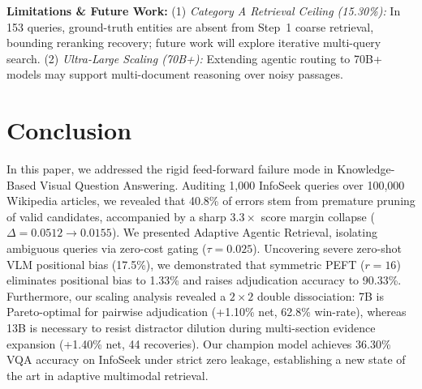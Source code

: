 \documentclass[conference]{IEEEtran}
\begin{document}
\textbf{Limitations \& Future Work:}
(1) \textit{Category A Retrieval Ceiling (15.30\%):} In 153 queries, ground-truth entities are absent from Step~1 coarse retrieval, bounding reranking recovery; future work will explore iterative multi-query search.
(2) \textit{Ultra-Large Scaling (70B+):} Extending agentic routing to 70B+ models may support multi-document reasoning over noisy passages.


\section{Conclusion}
In this paper, we addressed the rigid feed-forward failure mode in Knowledge-Based Visual Question Answering. Auditing 1,000 InfoSeek queries over 100,000 Wikipedia articles, we revealed that 40.8\% of errors stem from premature pruning of valid candidates, accompanied by a sharp $3.3\times$ score margin collapse ($\Delta = 0.0512 \to 0.0155$). We presented Adaptive Agentic Retrieval, isolating ambiguous queries via zero-cost gating ($\tau = 0.025$). Uncovering severe zero-shot VLM positional bias (17.5\%), we demonstrated that symmetric PEFT ($r=16$) eliminates positional bias to 1.33\% and raises adjudication accuracy to 90.33\%. Furthermore, our scaling analysis revealed a $2 \times 2$ double dissociation: 7B is Pareto-optimal for pairwise adjudication (+1.10\% net, 62.8\% win-rate), whereas 13B is necessary to resist distractor dilution during multi-section evidence expansion (+1.40\% net, 44 recoveries). Our champion model achieves 36.30\% VQA accuracy on InfoSeek under strict zero leakage, establishing a new state of the art in adaptive multimodal retrieval.
\end{document}
